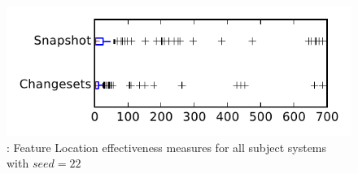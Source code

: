 
\begin{figure}
\centering
\includegraphics[height=0.4\textheight]{figures/flt_seed/rq1_tiny_22}
\caption{\rone: Feature Location effectiveness measures for all subject systems with $seed=22$}
\label{fig:flt_seed:rq1:tiny}
\end{figure}
